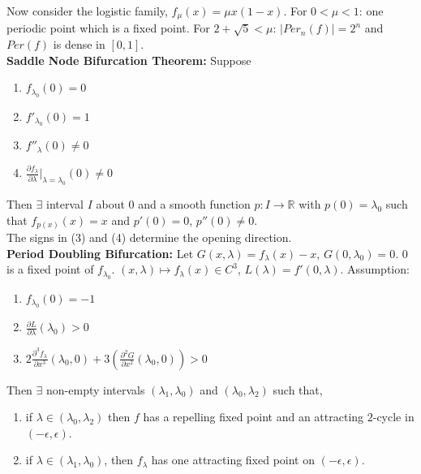 \documentclass[12pt]{article}
\begin{document}
Now consider the logistic family, $f_{\mu}(x) = \mu x (1-x)$. For $0 < \mu < 1$: one periodic point which is a fixed point. For $2 + \sqrt{5} < \mu$: $|Per_n(f)| = 2^n$ and $Per(f)$ is dense in $[0, 1]$.\\

\textbf{Saddle Node Bifurcation Theorem:} Suppose
\begin{enumerate}
\item $f_{\lambda_0}(0) = 0$
\item $f'_{\lambda_0}(0) = 1$
\item $f''_{\lambda}(0) \neq 0$
\item $\frac{\partial f_{\lambda}}{\partial \lambda}|_{\lambda = \lambda_0} (0) \neq 0$
\end{enumerate}

Then $\exists$ interval $I$ about $0$ and a smooth function $p: I \to \mathbb{R}$ with $p(0) = \lambda_0$ such that $f_{p(x)}(x) = x$ and $p'(0) = 0$, $p''(0) \neq 0$.\\

The signs in (3) and (4) determine the opening direction.\\

\textbf{Period Doubling Bifurcation:} Let $G(x, \lambda) = f_{\lambda}(x) - x$, $G(0, \lambda_0) = 0$. $0$ is a fixed point of $f_{\lambda_0}$. $(x, \lambda) \mapsto f_{\lambda}(x) \in C^3$, $L(\lambda) = f'(0, \lambda)$. Assumption:
\begin{enumerate}[label=(\alph*)]

\item $f_{\lambda_0}(0) = -1$

\item $\frac{\partial L}{\partial \lambda}(\lambda_0) > 0$

\item $2 \frac{\partial^3 f_{\lambda}}{\partial x^3}(\lambda_0, 0) + 3\left(\frac{\partial^2 G}{\partial x^2}(\lambda_0, 0)\right) > 0$

\end{enumerate}

Then $\exists$ non-empty intervals $(\lambda_1, \lambda_0)$ and $(\lambda_0, \lambda_2)$ such that,
\begin{enumerate}
\item if $\lambda \in (\lambda_0, \lambda_2)$ then $f$ has a repelling fixed point and an attracting $2$-cycle in $(-\epsilon, \epsilon)$.
\item if $\lambda \in (\lambda_1, \lambda_0)$, then $f_{\lambda}$ has one attracting fixed point on $(-\epsilon, \epsilon)$.
\end{enumerate}
\end{document}
